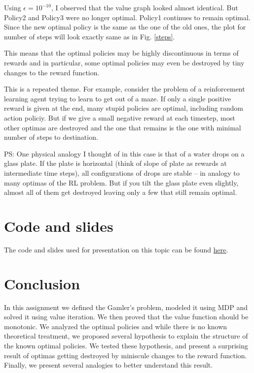 \documentclass{article}
\begin{document}
Using $\epsilon = 10^{-10}$, I observed that the value graph looked almost identical. But Policy2 and Policy3 were no longer optimal. Policy1 continues to remain optimal. Since the new optimal policy is the same as the one of the old ones, the plot for number of steps will look exactly same as in Fig. \ref{steps}.

This means that the optimal policies may be highly discontinuous in terms of rewards and in particular, some optimal policies may even be destroyed by tiny changes to the reward function.

This is a repeated theme. For example, consider the problem of a reinforcement learning agent trying to learn to get out of a maze. If only a single positive reward is given at the end, many stupid policies are optimal, including random action policiy. But if we give a small negative reward at each timestep, most other optimas are destroyed and the one that remains is the one with minimal number of steps to destination.

PS: One physical analogy I thought of in this case is that of a water drops on a glass plate. If the plate is horizontal (think of slope of plate as rewards at intermediate time steps), all configurations of drops are stable -- in analogy to many optimas of the RL problem. But if you tilt the glass plate even slightly, almost all of them get destroyed leaving only a few that still remain optimal.

\section{Code and slides}
The code and slides used for presentation on this topic can be found \href{https://github.com/AshishBora/reinforcement-learning/tree/master/gamblers_problem}{here}.

\section{Conclusion}
In this assignment we defined the Gamler's problem, modeled it using MDP and solved it using value iteration. We then proved that the value function should be monotonic. We analyzed the optimal policies and while there is no known theoretical treatment, we proposed several hypothesis to explain the structure of the known optimal policies. We tested these hypothesis, and present a surprising result of optimas getting destroyed by miniscule changes to the reward function. Finally, we present several analogies to better understand this result.
\end{document}
